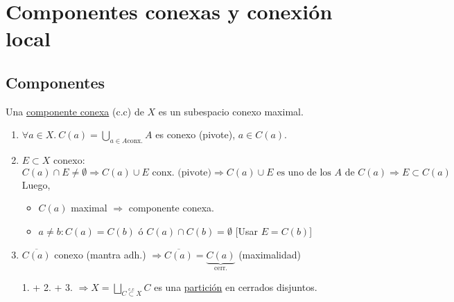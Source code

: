 \chapter{Componentes conexas y conexión local}%
\label{cha:componentes_conexas_y_conexion_local}
\section{Componentes}%
\label{sec:componentes}
\begin{defi}
Una \underline{componente conexa} (c.c) de $X$ es un subespacio conexo maximal.
\end{defi}

\begin{prop}
\begin{enumerate}
    \item $\forall a \in X.\ C\left( a \right) = \bigcup_{a \in A \text{conx.}} A$ es conexo (pivote), $a \in C\left( a \right)$.
    \item $E \subset X$ conexo: 
    \[
    C\left( a \right) \cap E \neq \emptyset \Rightarrow C\left( a \right) \cup E \text{ conx. (pivote)} \Rightarrow C\left( a \right) \cup E \text{ es uno de los } A \text{ de } C\left( a \right) \Rightarrow E \subset C\left( a \right) 
    \]
    Luego, 
    \begin{itemize}
        \item $C\left( a \right)$ maximal $\Rightarrow$ componente conexa.
        \item $a \neq b: C\left( a \right) = C\left( b \right)$ ó $C\left( a \right) \cap C\left( b \right) = \emptyset$ [Usar $E = C\left( b \right)$]
    \end{itemize}

    \item $\overline{C\left( a \right)}$ conexo (mantra adh.) $\Rightarrow \overline{C\left( a \right)} = \underbrace{C\left( a \right)}_{\text{cerr.}}$ (maximalidad)
    \item[1. + 2. + 3.] $\Rightarrow X = \bigsqcup_{C \stackrel{\text{c.c}}{\subset}  X} C$ es una \underline{partición} en cerrados disjuntos.
\end{enumerate} 
\end{prop}

